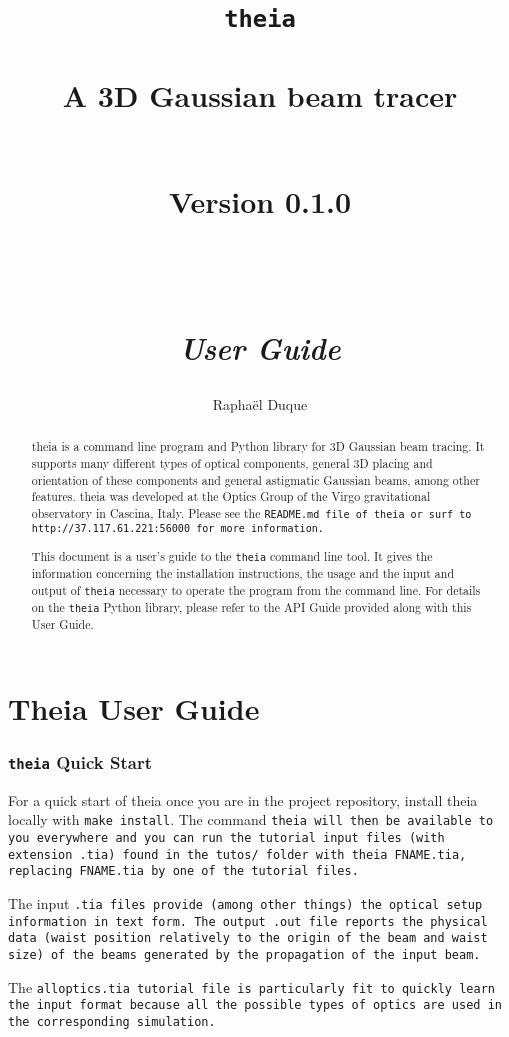 \documentclass{article}
\title{\texttt{theia} \\ \quad \\A 3D Gaussian beam tracer \\ \quad \\ \begin{small} Version 0.1.0 \end{small} \\ \quad \\ \textit{User Guide}}
\author{Rapha\"el Duque}
\begin{document}
\maketitle

\begin{abstract}
theia is a command line program and Python library for 3D Gaussian beam tracing. It supports many different types of optical components, general 3D placing and orientation of these components and general astigmatic Gaussian beams, among other features. theia was developed at the Optics Group of the Virgo gravitational observatory in Cascina, Italy. Please see the \tt{README.md} file of \tt{theia} or surf to \tt{http://37.117.61.221:56000} for more information.

This document is a user's guide to the \texttt{theia} command line tool. It gives the information concerning the installation instructions, the usage and the input and output of \texttt{theia} necessary to operate the program from the command line. For details on the \texttt{theia} Python library, please refer to the API Guide provided along with this User Guide.
\end{abstract}


\tableofcontents
\newpage

\part{Theia User Guide}
\section{\texttt{theia} Quick Start}
For a quick start of theia once you are in the project repository, install theia locally with \texttt{make install}. The command \tt{theia} will then be available to you everywhere and  you can run the tutorial input files (with extension \texttt{.tia}) found in the \texttt{tutos/} folder with \texttt{theia FNAME.tia}, replacing \texttt{FNAME.tia} by one of the tutorial files.

The input \tt{.tia} files provide (among other things) the optical setup information in text form. The output \tt{.out} file reports the physical data (waist position relatively to the origin of the beam and waist size) of the beams generated by the propagation of the input beam.

The \tt{alloptics.tia} tutorial file is particularly fit to quickly learn the input format because all the possible types of optics are used in the corresponding simulation. 
\end{document}
